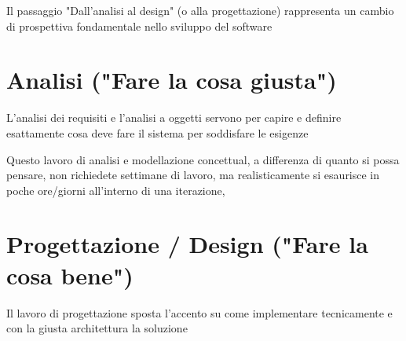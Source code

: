 Il passaggio "Dall'analisi al design" (o alla progettazione) rappresenta un cambio di prospettiva fondamentale nello sviluppo del software

\section{Analisi ("Fare la cosa giusta")}
L'analisi dei requisiti e l'analisi a oggetti servono per capire e definire esattamente cosa deve fare il sistema per soddisfare le esigenze

\vspace{\baselineskip}

Questo lavoro di analisi e modellazione concettual, a differenza di quanto si possa pensare, non richiedete settimane di lavoro, ma realisticamente si esaurisce in poche ore/giorni all'interno di una iterazione,

\section{Progettazione / Design ("Fare la cosa bene")}
Il lavoro di progettazione sposta l'accento su come implementare tecnicamente e con la giusta architettura la soluzione